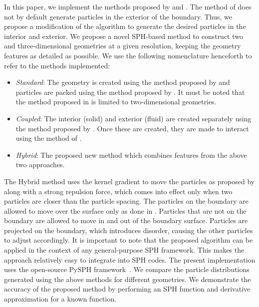\documentclass[preprint,12pt]{elsarticle}
\begin{document}
In this paper, we implement the methods proposed by
\citet{colagrossi2012particle} and \citet{jiang2015blue}. The method of
\citet{jiang2015blue} does not by default generate particles in the exterior
of the boundary. Thus, we propose a modification of the algorithm to generate
the desired particles in the interior and exterior. We propose a novel
SPH-based method to construct two and three-dimensional geometries at a given
resolution, keeping the geometry features as detailed as possible. We use the
following nomenclature henceforth to refer to the methods implemented:
\begin{itemize}
\item \emph{Standard}: The geometry is created using the method proposed by
  \citet{marrone-deltasph:cmame:2011} and particles are packed using the
  method proposed by \citet{colagrossi2012particle}. It must be noted that the
  method proposed in \cite{marrone-deltasph:cmame:2011} is limited to
  two-dimensional geometries.
\item \emph{Coupled}: The interior (solid) and exterior (fluid) are created
  separately using the method proposed by \citet{jiang2015blue}. Once these
  are created, they are made to interact using the method of
  \cite{colagrossi2012particle}.
\item \emph{Hybrid}: The proposed new method which combines features from the
  above two approaches.
\end{itemize}

The Hybrid method uses the kernel gradient to move the particles as proposed
by \citet{colagrossi2012particle} along with a strong repulsion force, which
comes into effect only when two particles are closer than the particle
spacing. The particles on the boundary are allowed to move over the surface
only as done in \cite{jiang2015blue}. Particles that are not on the boundary
are allowed to move in and out of the boundary surface. Particles are
projected on the boundary, which introduces disorder, causing the other
particles to adjust accordingly. It is important to note that the proposed
algorithm can be applied in the context of any general-purpose SPH framework.
This makes the approach relatively easy to integrate into SPH codes. The
present implementation uses the open-source PySPH
framework~\cite{pysph2020,PR:pysph:scipy16}. We compare the particle
distributions generated using the above methods for different geometries. We
demonstrate the accuracy of the proposed method by performing an SPH function
and derivative approximation for a known function.
\end{document}
